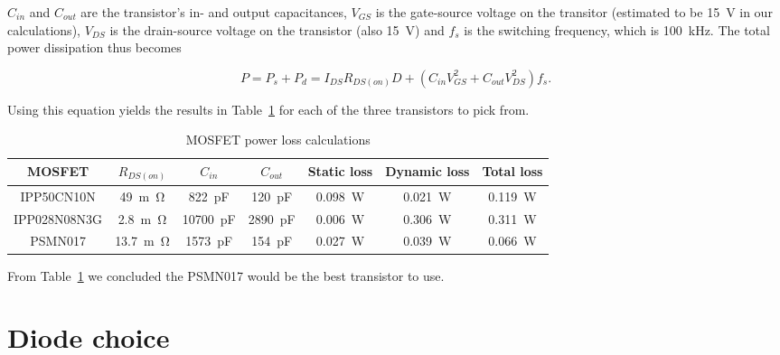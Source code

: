 \documentclass[11pt,titlepage]{report}
\begin{document}
$C_{in}$ and $C_{out}$ are the transistor's in- and output capacitances, $V_{GS}$ is the gate-source voltage on the transitor (estimated to be \SI{15}{V} in our calculations), $V_{DS}$ is the drain-source voltage on the transistor (also \SI{15}{V}) and $f_{s}$ is the switching frequency, which is \SI{100}{kHz}.
The total power dissipation thus becomes

\begin{equation}
P = P_{s} + P_{d} = I_{DS}R_{DS(on)}D + (C_{in}V_{GS}^2 + C_{out}V_{DS}^2)f_{s} .
\end{equation}

Using this equation yields the results in Table~\ref{tab:ass1-power-loss} for each of the three transistors to pick from.

\begin{table}[H]
	\centering
	\caption{MOSFET power loss calculations}
	\label{tab:ass1-power-loss}
	\begin{tabular}{c c c c c c c}
		\hline\hline
		MOSFET & $R_{DS(on)}$ & $C_{in}$ & $C_{out}$ & Static loss & Dynamic loss & Total loss \\
		\hline
		IPP50CN10N & \SI{49}{m\ohm} & \SI{822}{pF} & \SI{120}{pF} & \SI{0.098}{W} & \SI{0.021}{W} & \SI{0.119}{W} \\
		IPP028N08N3G & \SI{2.8}{m\ohm} & \SI{10700}{pF} & \SI{2890}{pF} & \SI{0.006}{W} & \SI{0.306}{W} & \SI{0.311}{W} \\
		PSMN017 & \SI{13.7}{m\ohm} & \SI{1573}{pF} & \SI{154}{pF} & \SI{0.027}{W} & \SI{0.039}{W} & \SI{0.066}{W} \\
		\hline
		\end{tabular}
\end{table}

From Table~\ref{tab:ass1-power-loss} we concluded the PSMN017 would be the best transistor to use.
 
\section{Diode choice}
\end{document}
